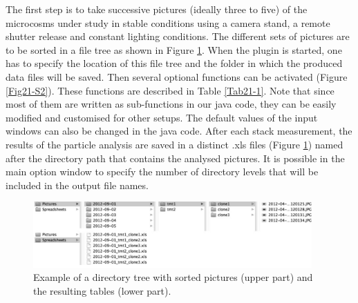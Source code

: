 The first step is to take successive pictures (ideally three to five) of the
microcosms under study in stable conditions using a camera stand, a remote
shutter release and constant lighting conditions. The different sets of pictures
are to be sorted in a file tree as shown in Figure \ref{Fig21-S1}. When the plugin is
started, one has to specify the location of this file tree and the folder in
which the produced data files will be saved. Then several optional functions can
be activated (Figure \ref{Fig21-S2}). These functions are described in Table \ref{Tab21-1}. Note that
since most of them are written as sub-functions in our java code, they can be
easily modified and customised for other setups. The default values of the input
windows can also be changed in the java code. After each stack measurement,
the results of the particle analysis are saved in a distinct .xls files
(Figure \ref{Fig21-S1}) named after the directory path that contains the analysed pictures.
It is possible in the main option window to specify the number of directory
levels that will be included in the output file names.

\begin{figure}[!ht] %
\centering
\includegraphics[width=0.95\textwidth]{2_Methodo/Fig/FigS1.pdf}
\caption[  Example of a directory tree and
resulting tables]{ Example of a directory tree with sorted pictures (upper part)
and the resulting tables (lower part).
}
\label{Fig21-S1}
\end{figure}

